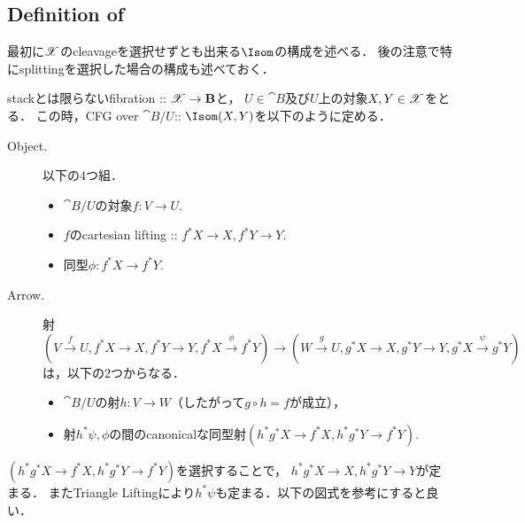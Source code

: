 \documentclass[a4paper, dvipdfmx]{jsarticle}
\begin{document}
\subsection{Definition of }
最初に$\mathscr{X}$のcleavageを選択せずとも出来る$\Isom$の構成を述べる．
後の注意で特にsplittingを選択した場合の構成も述べておく．
\begin{Def}[$\Isom(X, Y)$]
    stackとは限らないfibration :: $\mathscr{X} \to \mathbf{B}$と，
    $U \in \cat{B}$及び$U$上の対象$X, Y \in \mathscr{X}$をとる．
    この時，CFG over $\cat{B}/U$:: $\Isom(X, Y)$を以下のように定める．
    \begin{description}
        \item[Object.]
            以下の$4$つ組．
            \begin{itemize}
                \item $\cat{B}/U$の対象$f \colon V \to U$.
                \item $f$のcartesian lifting :: $f^*X \to X, f^*Y \to Y$.
                \item 同型$\phi \colon f^*X \to f^*Y$.
            \end{itemize}

        \item[Arrow.]
            射
            \[
                (V \xrightarrow{f} U, f^*X \to X, f^*Y \to Y, f^*X \xrightarrow{\phi} f^*Y)
                \to
                (W \xrightarrow{g} U, g^*X \to X, g^*Y \to Y, g^*X \xrightarrow{\psi} g^*Y)
            \]
            は，以下の$2$つからなる．
            \begin{itemize}
                \item $\cat{B}/U$の射$h \colon V \to W$（したがって$g \circ h=f$が成立），
                \item 射$h^*\psi, \phi$の間のcanonicalな同型射$(h^*g^*X \to f^*X, h^*g^*Y \to f^*Y)$.
            \end{itemize}
    \end{description}
    $(h^*g^*X \to f^*X, h^*g^*Y \to f^*Y)$を選択することで，
    $h^*g^*X \to X, h^*g^*Y \to Y$が定まる．
    またTriangle Liftingにより$h^*\psi$も定まる．以下の図式を参考にすると良い．
    \begin{center}
\end{center}
\end{Def}
\end{document}
